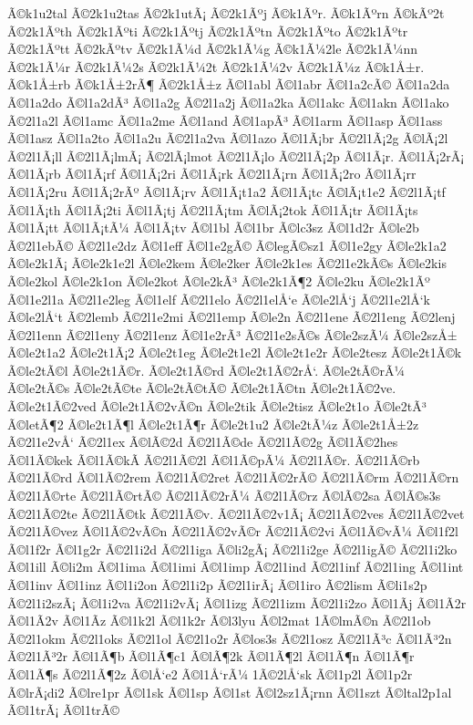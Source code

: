 {Ã©k1u2tal
Ã©2k1u2tas
Ã©2k1utÃ¡
Ã©2k1Ãºj
Ã©k1Ãºr.
Ã©k1Ãºrn
Ã©kÃº2t
Ã©2k1Ãºth
Ã©2k1Ãºti
Ã©2k1Ãºtj
Ã©2k1Ãºtn
Ã©2k1Ãºto
Ã©2k1Ãºtr
Ã©2k1Ãºtt
Ã©2kÃºtv
Ã©2k1Ã¼d
Ã©2k1Ã¼g
Ã©k1Ã¼2le
Ã©2k1Ã¼nn
Ã©2k1Ã¼r
Ã©2k1Ã¼2s
Ã©2k1Ã¼2t
Ã©2k1Ã¼2v
Ã©2k1Ã¼z
Ã©k1Å±r.
Ã©k1Å±rb
Ã©k1Å±2rÃ¶
Ã©2k1Å±z
Ã©l1abl
Ã©l1abr
Ã©l1a2cÃ©
Ã©l1a2da
Ã©l1a2do
Ã©l1a2dÃ³
Ã©l1a2g
Ã©2l1a2j
Ã©l1a2ka
Ã©l1akc
Ã©l1akn
Ã©l1ako
Ã©2l1a2l
Ã©l1amc
Ã©l1a2me
Ã©l1and
Ã©l1apÃ³
Ã©l1arm
Ã©l1asp
Ã©l1ass
Ã©l1asz
Ã©l1a2to
Ã©l1a2u
Ã©2l1a2va
Ã©l1azo
Ã©l1Ã¡br
Ã©2l1Ã¡2g
Ã©lÃ¡2l
Ã©2l1Ã¡ll
Ã©2l1Ã¡lmÃ¡
Ã©2lÃ¡lmot
Ã©2l1Ã¡lo
Ã©2l1Ã¡2p
Ã©l1Ã¡r.
Ã©l1Ã¡2rÃ¡
Ã©l1Ã¡rb
Ã©l1Ã¡rf
Ã©l1Ã¡2ri
Ã©l1Ã¡rk
Ã©2l1Ã¡rn
Ã©l1Ã¡2ro
Ã©l1Ã¡rr
Ã©l1Ã¡2ru
Ã©l1Ã¡2rÃº
Ã©l1Ã¡rv
Ã©l1Ã¡t1a2
Ã©l1Ã¡tc
Ã©lÃ¡t1e2
Ã©2l1Ã¡tf
Ã©l1Ã¡th
Ã©l1Ã¡2ti
Ã©l1Ã¡tj
Ã©2l1Ã¡tm
Ã©lÃ¡2tok
Ã©l1Ã¡tr
Ã©l1Ã¡ts
Ã©l1Ã¡tt
Ã©l1Ã¡tÃ¼
Ã©l1Ã¡tv
Ã©l1bl
Ã©l1br
Ã©lc3sz
Ã©l1d2r
Ã©le2b
Ã©2l1ebÃ©
Ã©2l1e2dz
Ã©l1eff
Ã©l1e2gÃ©
Ã©legÃ©sz1
Ã©l1e2gy
Ã©le2k1a2
Ã©le2k1Ã¡
Ã©le2k1e2l
Ã©le2kem
Ã©le2ker
Ã©le2k1es
Ã©2l1e2kÃ©s
Ã©le2kis
Ã©le2kol
Ã©le2k1on
Ã©le2kot
Ã©le2kÃ³
Ã©le2k1Ã¶2
Ã©le2ku
Ã©le2k1Ãº
Ã©l1e2l1a
Ã©2l1e2leg
Ã©l1elf
Ã©2l1elo
Ã©2l1elÅ‘e
Ã©le2lÅ‘j
Ã©2l1e2lÅ‘k
Ã©le2lÅ‘t
Ã©2lemb
Ã©2l1e2mi
Ã©2l1emp
Ã©le2n
Ã©2l1ene
Ã©2l1eng
Ã©2lenj
Ã©2l1enn
Ã©2l1eny
Ã©2l1enz
Ã©l1e2rÃ³
Ã©2l1e2sÃ©s
Ã©le2szÃ¼
Ã©le2szÅ±
Ã©le2t1a2
Ã©le2t1Ã¡2
Ã©le2t1eg
Ã©le2t1e2l
Ã©le2t1e2r
Ã©le2tesz
Ã©le2t1Ã©k
Ã©le2tÃ©l
Ã©le2t1Ã©r.
Ã©le2t1Ã©rd
Ã©le2t1Ã©2rÅ‘.
Ã©le2tÃ©rÃ¼
Ã©le2tÃ©s
Ã©le2tÃ©te
Ã©le2tÃ©tÃ©
Ã©le2t1Ã©tn
Ã©le2t1Ã©2ve.
Ã©le2t1Ã©2ved
Ã©le2t1Ã©2vÃ©n
Ã©le2tik
Ã©le2tisz
Ã©le2t1o
Ã©le2tÃ³
Ã©letÃ¶2
Ã©le2t1Ã¶l
Ã©le2t1Ã¶r
Ã©le2t1u2
Ã©le2tÃ¼z
Ã©le2t1Å±2z
Ã©2l1e2vÅ‘
Ã©2l1ex
Ã©lÃ©2d
Ã©2l1Ã©de
Ã©2l1Ã©2g
Ã©l1Ã©2hes
Ã©l1Ã©kek
Ã©l1Ã©kÃ­
Ã©2l1Ã©2l
Ã©l1Ã©pÃ¼
Ã©2l1Ã©r.
Ã©2l1Ã©rb
Ã©2l1Ã©rd
Ã©l1Ã©2rem
Ã©2l1Ã©2ret
Ã©2l1Ã©2rÃ©
Ã©2l1Ã©rm
Ã©2l1Ã©rn
Ã©2l1Ã©rte
Ã©2l1Ã©rtÃ©
Ã©2l1Ã©2rÃ¼
Ã©2l1Ã©rz
Ã©lÃ©2sa
Ã©lÃ©s3s
Ã©2l1Ã©2te
Ã©2l1Ã©tk
Ã©2l1Ã©v.
Ã©2l1Ã©2v1Ã¡
Ã©2l1Ã©2ves
Ã©2l1Ã©2vet
Ã©2l1Ã©vez
Ã©l1Ã©2vÃ©n
Ã©2l1Ã©2vÃ©r
Ã©2l1Ã©2vi
Ã©l1Ã©vÃ¼
Ã©l1f2l
Ã©l1f2r
Ã©l1g2r
Ã©2l1i2d
Ã©2l1iga
Ã©li2gÃ¡
Ã©2l1i2ge
Ã©2l1igÃ©
Ã©2l1i2ko
Ã©l1ill
Ã©li2m
Ã©l1ima
Ã©l1imi
Ã©l1imp
Ã©2l1ind
Ã©2l1inf
Ã©2l1ing
Ã©l1int
Ã©l1inv
Ã©l1inz
Ã©l1i2on
Ã©2l1i2p
Ã©2l1irÃ¡
Ã©l1iro
Ã©2lism
Ã©li1s2p
Ã©2l1i2szÃ¡
Ã©l1i2va
Ã©2l1i2vÃ¡
Ã©l1izg
Ã©2l1izm
Ã©2l1i2zo
Ã©l1Ã­j
Ã©l1Ã­2r
Ã©l1Ã­2v
Ã©l1Ã­z
Ã©l1k2l
Ã©l1k2r
Ã©l3lyu
Ã©l2mat
1Ã©lmÃ©n
Ã©2l1ob
Ã©2l1okm
Ã©2l1oks
Ã©2l1ol
Ã©2l1o2r
Ã©los3s
Ã©2l1osz
Ã©2l1Ã³c
Ã©l1Ã³2n
Ã©2l1Ã³2r
Ã©l1Ã¶b
Ã©l1Ã¶c1
Ã©lÃ¶2k
Ã©l1Ã¶2l
Ã©l1Ã¶n
Ã©l1Ã¶r
Ã©l1Ã¶s
Ã©2l1Ã¶2z
Ã©lÅ‘e2
Ã©l1Å‘rÃ¼
1Ã©2lÅ‘sk
Ã©l1p2l
Ã©l1p2r
Ã©lrÃ¡di2
Ã©lre1pr
Ã©l1sk
Ã©l1sp
Ã©l1st
Ã©l2sz1Ã¡rnn
Ã©l1szt
Ã©ltal2p1al
Ã©l1trÃ¡
Ã©l1trÃ©
}
